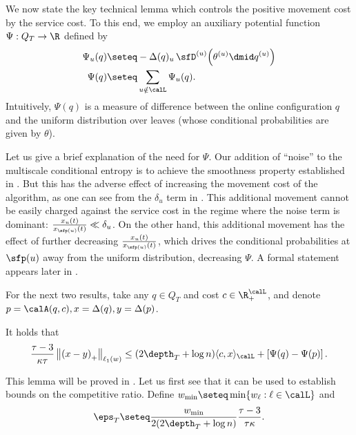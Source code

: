 We now state the key technical lemma
which controls the positive movement cost by
the service cost.  To this end, we employ an auxiliary potential function $\Psi : Q_T \to \R$ defined by
\begin{align*}
\Psi_u(q) &\seteq - \Delta(q)_u\,\sfD^{(u)}\!\left(\theta^{(u)} \dmid q^{(u)}\right) \\
\Psi(q) &\seteq \sum_{u \notin \calL} \Psi_u(q).
\end{align*}
Intuitively, $\Psi(q)$ is a measure of difference between the online configuration $q$ and the uniform distribution over leaves (whose conditional probabilities are given by $\theta$).

Let us give a brief explanation of the need for $\Psi$.
Our addition of ``noise'' to the multiscale conditional entropy
is to achieve the smoothness property established in .
But this has the adverse effect of increasing the movement cost
of the algorithm, as one can see from the $\delta_u$ term in .
This additional movement cannot be easily charged against the service cost in
the regime where the noise term is dominant:  $\frac{x_u(t)}{x_{\sfp(u)}(t)} \ll \delta_u$.
On the other hand, this additional movement has the effect of further decreasing $\frac{x_u(t)}{x_{\sfp(u)}(t)}$,
which drives the conditional probabilities at $\sfp(u)$ away from the uniform distribution,
decreasing $\Psi$.  A formal statement appears later in .

For the next two results, take any $q \in Q_T$ and cost $c \in \R_+^{\calL}$, and denote $p=\calA(q,c), x =\Delta(q),y=\Delta(p)$.

\begin{lemma}
	\label{lem:movement}
   It holds that
	\[
	\frac{\tau-3}{\kappa \tau} \left\|\left(x-y\right)_+\right\|_{\ell_1(w)} \leq (2 \depth_T + \log n) \langle c, x\rangle_{\calL} +
	\left[\Psi(q)-\Psi(p)\right].
	\]
\end{lemma}

This lemma will be proved in .
Let us first see that it can be used to establish bounds on the competitive ratio.
Define $w_{\min} \seteq \min \{ w_{\ell} : \ell \in \calL \}$
and
\[
\eps_T \seteq \frac{w_{\min}}{2 (2\depth_T+\log n)} \frac{\tau-3}{\tau\kappa}.
\]

